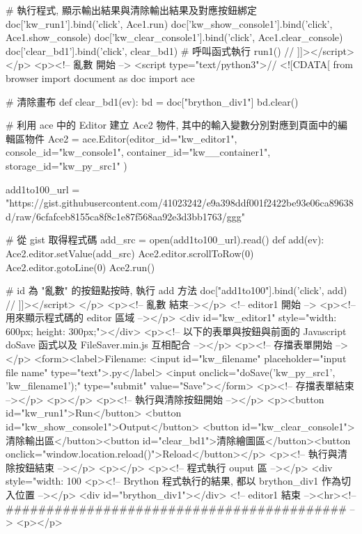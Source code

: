 # 執行程式, 顯示輸出結果與清除輸出結果及對應按鈕綁定
doc['kw_run1'].bind('click', Ace1.run)
doc['kw_show_console1'].bind('click', Ace1.show_console)
doc['kw_clear_console1'].bind('click', Ace1.clear_console)
doc['clear_bd1'].bind('click', clear_bd1)
# 呼叫函式執行
run1()
// ]]></script>
</p>
<p><!-- 亂數 開始 -->
<script type="text/python3">// <![CDATA[
from browser import document as doc
import ace

# 清除畫布
def clear_bd1(ev):
    bd = doc["brython_div1"]
    bd.clear()

# 利用 ace 中的 Editor 建立 Ace2 物件, 其中的輸入變數分別對應到頁面中的編輯區物件
Ace2 = ace.Editor(editor_id="kw_editor1", console_id="kw_console1", container_id="kw__container1", storage_id="kw_py_src1" )

add1to100_url = "https://gist.githubusercontent.com/41023242/e9a398ddf001f2422be93e06ca89638d/raw/6cfafceb8155ca8f8c1e87f568aa92e3d3bb1763/ggg"

# 從 gist 取得程式碼
add_src = open(add1to100_url).read()
def add(ev):
    Ace2.editor.setValue(add_src)
    Ace2.editor.scrollToRow(0)
    Ace2.editor.gotoLine(0)
    Ace2.run()

# id 為 "亂數" 的按鈕點按時, 執行 add 方法
doc["add1to100"].bind('click', add)
// ]]></script>
</p>
<p><!-- 亂數 結束--></p>
<!-- editor1 開始 -->
<p><!-- 用來顯示程式碼的 editor 區域 --></p>
<div id="kw_editor1" style="width: 600px; height: 300px;"></div>
<p><!-- 以下的表單與按鈕與前面的 Javascript doSave 函式以及 FileSaver.min.js 互相配合 --></p>
<p><!-- 存擋表單開始 --></p>
<form><label>Filename: <input id="kw_filename" placeholder="input file name" type="text">.py</label> <input onclick="doSave('kw_py_src1', 'kw_filename1');" type="submit" value="Save"></form>
<p><!-- 存擋表單結束 --></p>
<p></p>
<p><!-- 執行與清除按鈕開始 --></p>
<p><button id="kw_run1">Run</button> <button id="kw_show_console1">Output</button> <button id="kw_clear_console1">清除輸出區</button><button id="clear_bd1">清除繪圖區</button><button onclick="window.location.reload()">Reload</button></p>
<p><!-- 執行與清除按鈕結束 --></p>
<p></p>
<p><!-- 程式執行 ouput 區 --></p>
<div style="width: 100%
<p><!-- Brython 程式執行的結果, 都以 brython_div1 作為切入位置 --></p>
<div id="brython_div1"></div>
<!-- editor1 結束 --><hr><!-- ########################################## -->
<p></p>
\newpage
